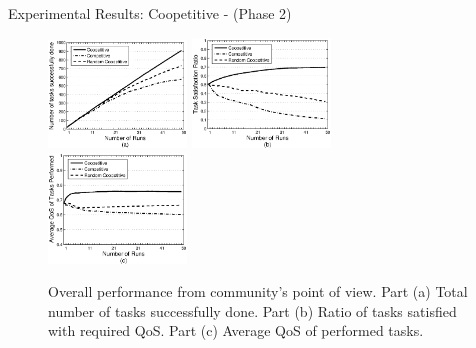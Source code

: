 \documentclass{beamer}
\begin{document}
\begin{frame}{Experimental Results: Coopetitive - (Phase 2)}
    \begin{figure}[h]
        \centering
        \includegraphics[width=1.45in]{figures/graphtaskdone.eps}
        \includegraphics[width=1.45in]{figures/graphtasksatisfaction.eps}
        \includegraphics[width=1.45in]{figures/graphavgqostask.eps}
        \caption{Overall performance from community's point of view. Part
        (a) Total number of tasks successfully done. Part (b) Ratio of
        tasks satisfied with required QoS. Part (c) Average QoS of
        performed tasks.} \label{graph_task}
    \end{figure}
\end{frame}
\end{document}

